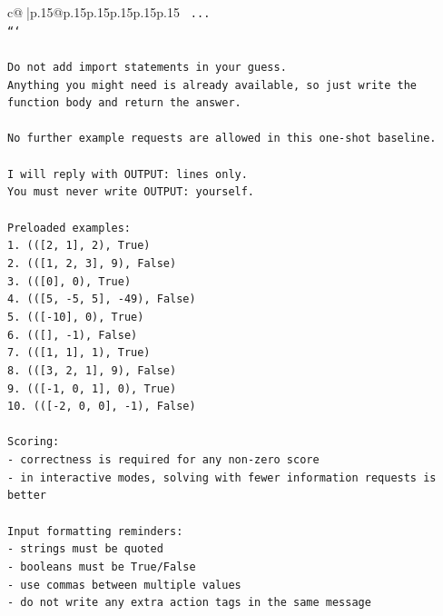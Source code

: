 \documentclass{article}
\begin{document}
{\begin{supertabular}{c@{$\;$}|p{.15\linewidth}@{}p{.15\linewidth}p{.15\linewidth}p{.15\linewidth}p{.15\linewidth}p{.15\linewidth}}
{{{\texttt{    ...} \\
\texttt{```} \\
\\ 
\texttt{Do not add import statements in your guess.} \\
\texttt{Anything you might need is already available, so just write the function body and return the answer.} \\
\\ 
\texttt{No further example requests are allowed in this one{-}shot baseline.} \\
\\ 
\texttt{I will reply with OUTPUT: lines only.} \\
\texttt{You must never write OUTPUT: yourself.} \\
\\ 
\texttt{Preloaded examples:} \\
\texttt{1. (({[}2, 1{]}, 2), True)} \\
\texttt{2. (({[}1, 2, 3{]}, 9), False)} \\
\texttt{3. (({[}0{]}, 0), True)} \\
\texttt{4. (({[}5, {-}5, 5{]}, {-}49), False)} \\
\texttt{5. (({[}{-}10{]}, 0), True)} \\
\texttt{6. (({[}{]}, {-}1), False)} \\
\texttt{7. (({[}1, 1{]}, 1), True)} \\
\texttt{8. (({[}3, 2, 1{]}, 9), False)} \\
\texttt{9. (({[}{-}1, 0, 1{]}, 0), True)} \\
\texttt{10. (({[}{-}2, 0, 0{]}, {-}1), False)} \\
\\ 
\texttt{Scoring:} \\
\texttt{{-} correctness is required for any non{-}zero score} \\
\texttt{{-} in interactive modes, solving with fewer information requests is better} \\
\\ 
\texttt{Input formatting reminders:} \\
\texttt{{-} strings must be quoted} \\
\texttt{{-} booleans must be True/False} \\
\texttt{{-} use commas between multiple values} \\
\texttt{{-} do not write any extra action tags in the same message} \\
\\ 
}}}
\end{supertabular}}
\end{document}
